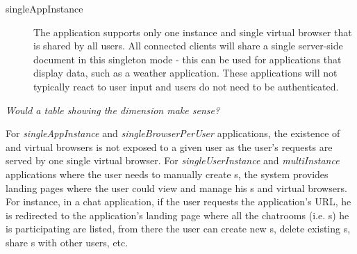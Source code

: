 \begin{description}
\item[singleAppInstance] The application supports only one instance and single virtual browser
    that is shared by all users.
    All connected clients will share a single server-side document in this singleton mode - this can be
    used for applications that display data, such as a weather application. These applications will not
    typically react to user input and users do not need to be authenticated.

\end{description}

\emph{Would a table showing the dimension make sense?}

For \emph{singleAppInstance} and \emph{singleBrowserPerUser} applications,
the existence of \appins{} and virtual browsers is not exposed to a given user as
the user's requests are served by one single virtual browser.
For \emph{singleUserInstance} and \emph{multiInstance} applications where the user
needs to manually create \appins{}s,
the system provides landing pages where the user 
could view and manage his \appins{}s and virtual browsers.
For instance, in a chat application, if the user requests the application's URL,
he is redirected to the application's landing page where all the
 chatrooms (i.e. \appins{}s) he is participating are listed,
from there the user can create new \appins{}s, delete existing \appins{}s, share
\appins{}s with other users, etc.






